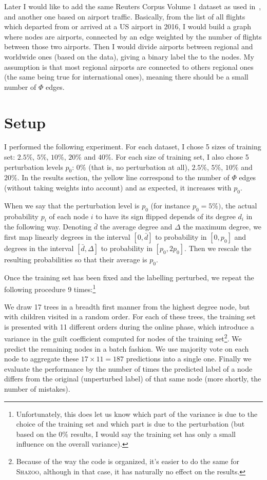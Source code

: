 \documentclass[a4paper,final,notitlepage,11pt,svgnames]{article}
\newcommand{\shazoo}{\textsc{Shazoo}}
\begin{document}
Later I would like to add the same Reuters Corpus Volume 1 dataset as used
in~\autocite{WTA13}, and another one based on airport traffic. Basically, from
the list of all flights which departed from or arrived at a US airport in
2016, I would build a graph where nodes are airports, connected by an edge
weighted by the number of flights between those two airports. Then I would
divide airports between regional and worldwide ones (based on the data), giving
a binary label the to the nodes. My assumption is that most regional airports are
connected to others regional ones (the same being true for international ones),
meaning there should be a small number of $\Phi$ edges.

\section*{Setup}
\label{sec:Protocol}

I performed the following experiment. For each dataset, I chose 5 sizes of
training set: $2.5\%$, $5\%$, $10\%$, $20\%$ and $40\%$. For each size of
training set, I also chose 5 perturbation levels $p_0$: $0\%$ (that is, no
perturbation at all), $2.5\%$, $5\%$, $10\%$ and $20\%$. In the results section,
the yellow line correspond to the number of $\Phi$ edges (without taking weights
into account) and as expected, it increases with $p_0$.

When we say that the perturbation level is $p_0$ (for instance $p_0=5\%)$, the
actual probability $p_i$ of each node $i$ to have its sign flipped depends of
its degree $d_i$ in the following way. Denoting $\bar{d}$ the average degree and
$\Delta$ the maximum degree, we first map linearly degrees in the interval $[0,
\bar{d}]$ to probability in $[0, p_0]$ and degrees in the interval $[\bar{d},
\Delta]$ to probability in $[p_0, 2p_0]$. Then we rescale the resulting
probabilities so that their average is $p_0$.

Once the training set has been fixed and the labelling perturbed, we repeat the
following procedure 9 times:\footnote{Unfortunately, this does let us know
which part of the variance is due to the choice of the training set and which
part is due to the perturbation (but based on the $0\%$ results, I would say the
training set has only a small influence on the overall variance).}

We draw 17 trees in a breadth first manner from the highest degree node, but
with children visited in a random order. For each of these trees, the training
set is presented with 11 different orders during the online phase, which
introduce a variance in the guilt coefficient computed for nodes of the training
set\footnote{Because of the way the code is organized, it's easier to do the
same for \shazoo{}, although in that case, it has naturally no effect on the
results.}. We predict the remaining nodes in a batch fashion. We use majority
vote on each node to aggregate these $17\times 11 = 187$ predictions into a
single one. Finally we evaluate the performance by the number of times the
predicted label of a node differs from the original (unperturbed label) of that
same node (more shortly, the number of mistakes).
\end{document}
